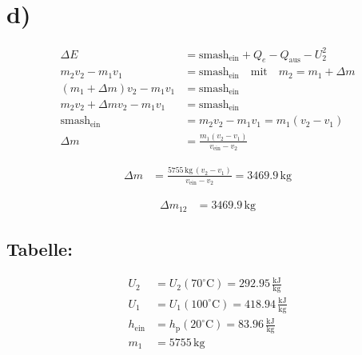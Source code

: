 

\section*{d)}
\begin{align*}
\Delta E &= \text{smash}_{\text{ein}} + Q_e - Q_{\text{aus}} - U_2^2 \\
m_2 v_2 - m_1 v_1 &= \text{smash}_{\text{ein}} \quad \text{mit} \quad m_2 = m_1 + \Delta m \\
(m_1 + \Delta m) v_2 - m_1 v_1 &= \text{smash}_{\text{ein}} \\
m_2 v_2 + \Delta m v_2 - m_1 v_1 &= \text{smash}_{\text{ein}} \\
\text{smash}_{\text{ein}} &= m_2 v_2 - m_1 v_1 = m_1 (v_2 - v_1) \\
\Delta m &= \frac{m_1 (v_2 - v_1)}{v_{\text{ein}} - v_2}
\end{align*}

\begin{align*}
\Delta m &= \frac{5755 \, \text{kg} \, (v_2 - v_1)}{v_{\text{ein}} - v_2} = 3469.9 \, \text{kg}
\end{align*}

\begin{align*}
\Delta m_{12} &= 3469.9 \, \text{kg}
\end{align*}

\subsection*{Tabelle:}
\begin{align*}
U_2 &= U_2 (70^\circ \text{C}) = 292.95 \, \frac{\text{kJ}}{\text{kg}} \\
U_1 &= U_1 (100^\circ \text{C}) = 418.94 \, \frac{\text{kJ}}{\text{kg}} \\
h_{\text{ein}} &= h_{\text{p}} (20^\circ \text{C}) = 83.96 \, \frac{\text{kJ}}{\text{kg}} \\
m_1 &= 5755 \, \text{kg}
\end{align*}